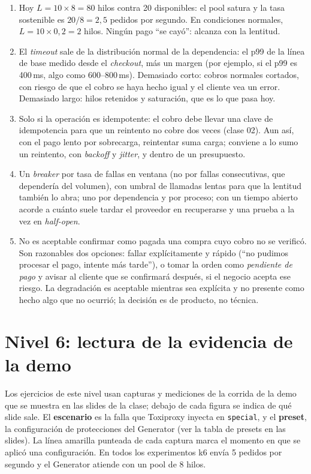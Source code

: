 \documentclass[variant=guia,cover=institutional,mode=screen]{ua-engineering-v6-article}
\begin{document}
\begin{uaanswer}
\begin{enumerate}
\item Hoy $L = 10 \times 8 = 80$ hilos contra 20 disponibles: el pool satura y la tasa sostenible es $20/8 = 2{,}5$ pedidos por segundo. En condiciones normales, $L = 10 \times 0{,}2 = 2$ hilos. Ningún pago ``se cayó'': alcanza con la lentitud.
\item El \emph{timeout} sale de la distribución normal de la dependencia: el p99 de la línea de base medido desde el \emph{checkout}, más un margen (por ejemplo, si el p99 es 400\,ms, algo como 600--800\,ms). Demasiado corto: cobros normales cortados, con riesgo de que el cobro se haya hecho igual y el cliente vea un error. Demasiado largo: hilos retenidos y saturación, que es lo que pasa hoy.
\item Solo si la operación es idempotente: el cobro debe llevar una clave de idempotencia para que un reintento no cobre dos veces (clase 02). Aun así, con el pago lento por sobrecarga, reintentar suma carga; conviene a lo sumo un reintento, con \emph{backoff} y \emph{jitter}, y dentro de un presupuesto.
\item Un \emph{breaker} por tasa de fallas en ventana (no por fallas consecutivas, que dependería del volumen), con umbral de llamadas lentas para que la lentitud también lo abra; uno por dependencia y por proceso; con un tiempo abierto acorde a cuánto suele tardar el proveedor en recuperarse y una prueba a la vez en \emph{half-open}.
\item No es aceptable confirmar como pagada una compra cuyo cobro no se verificó. Son razonables dos opciones: fallar explícitamente y rápido (``no pudimos procesar el pago, intente más tarde''), o tomar la orden como \emph{pendiente de pago} y avisar al cliente que se confirmará después, si el negocio acepta ese riesgo. La degradación es aceptable mientras sea explícita y no presente como hecho algo que no ocurrió; la decisión es de producto, no técnica.
\end{enumerate}
\end{uaanswer}


\section{Nivel 6: lectura de la evidencia de la demo}
Los ejercicios de este nivel usan capturas y mediciones de la corrida de la demo que se muestra en las slides de la clase; debajo de cada figura se indica de qué slide sale. El \textbf{escenario} es la falla que Toxiproxy inyecta en \texttt{special}, y el \textbf{preset}, la configuración de protecciones del Generator (ver la tabla de presets en las slides). La línea amarilla punteada de cada captura marca el momento en que se aplicó una configuración. En todos los experimentos k6 envía 5 pedidos por segundo y el Generator atiende con un pool de 8 hilos.
\end{document}
